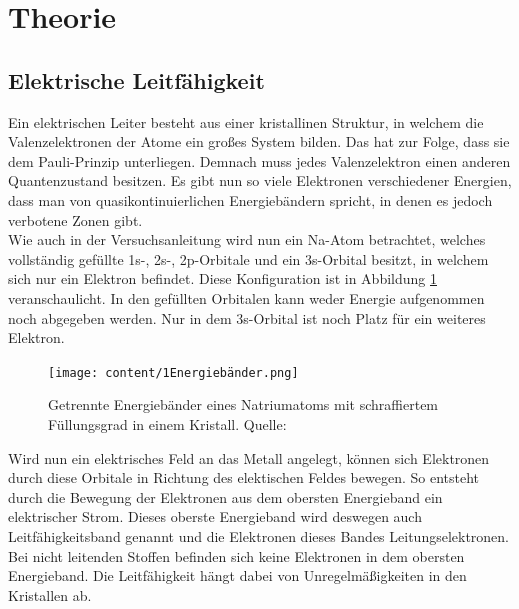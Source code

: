 \section{Theorie}
\label{sec:Theorie}
\subsection{Elektrische Leitfähigkeit}
Ein elektrischen Leiter besteht aus einer kristallinen Struktur, in welchem die Valenzelektronen der Atome
ein großes System bilden. Das hat zur Folge, dass sie dem Pauli-Prinzip unterliegen. Demnach muss jedes
Valenzelektron einen anderen Quantenzustand besitzen. Es gibt nun so viele Elektronen verschiedener Energien,
dass man von quasikontinuierlichen Energiebändern spricht, in denen es jedoch verbotene Zonen gibt.\\
Wie auch in der Versuchsanleitung \cite{AP01}
wird nun ein Na-Atom betrachtet, welches vollständig gefüllte 1s-, 2s-, 2p-Orbitale und ein 3s-Orbital besitzt,
in welchem sich nur ein Elektron befindet. Diese Konfiguration ist in Abbildung \ref{fig:Energiebander}
veranschaulicht. In den gefüllten Orbitalen kann weder Energie aufgenommen noch abgegeben werden. Nur in dem
3s-Orbital ist noch Platz für ein weiteres Elektron.\\
%
\begin{figure}[H]
    \centering
    \texttt{[image: content/1Energiebänder.png]}
    \caption{Getrennte Energiebänder eines Natriumatoms mit schraffiertem Füllungsgrad in einem Kristall. Quelle: \cite{AP01}}
    \label{fig:Energiebander}
\end{figure}
%
\noindent Wird nun ein elektrisches Feld an das Metall angelegt, können sich Elektronen durch diese Orbitale in Richtung des
elektischen Feldes bewegen. So entsteht durch die Bewegung der Elektronen aus dem obersten Energieband
ein elektrischer Strom. Dieses oberste Energieband wird deswegen auch Leitfähigkeitsband genannt und die
Elektronen dieses Bandes Leitungselektronen. Bei nicht leitenden Stoffen befinden sich keine Elektronen in dem
obersten Energieband. Die Leitfähigkeit hängt dabei von Unregelmäßigkeiten in den Kristallen ab.
